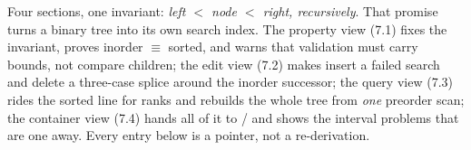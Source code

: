

Four sections, one invariant: \emph{left $<$ node $<$ right, recursively}. That promise turns a
binary tree into its own search index. The property view (7.1) fixes the invariant, proves inorder
$\equiv$ sorted, and warns that validation must carry bounds, not compare children; the edit view
(7.2) makes insert a failed search and delete a three-case splice around the inorder successor; the
query view (7.3) rides the sorted line for ranks and rebuilds the whole tree from \emph{one} preorder
scan; the container view (7.4) hands all of it to / and shows the
interval problems that are one  away. Every entry below is a pointer, not a
re-derivation.

